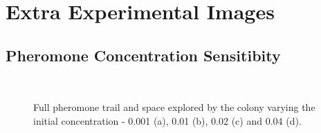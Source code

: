 \chapter{Extra Experimental Images}

\section{Pheromone Concentration Sensitibity}
\label{ap:exp-1}

\begin{figure}[H]
\myfloatalign
{} \quad
{} \\
 \quad
{}
\caption{Full pheromone trail and space explored by the colony varying the initial concentration - 0.001 (a), 0.01 (b), 0.02 (c) and 0.04 (d).}\label{fig:ap-exp-01}
\end{figure}



